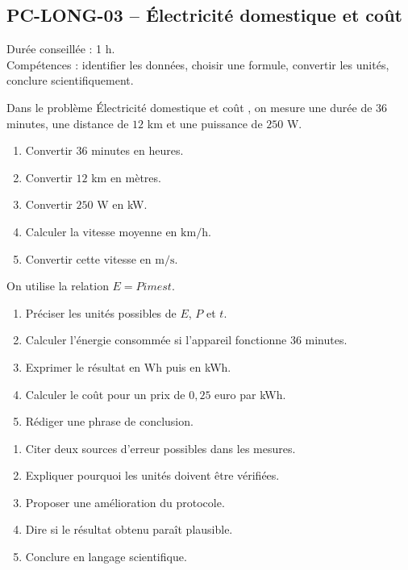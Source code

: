\documentclass[11pt,a4paper]{article}
\newcounter{exercice}
\begin{document}
\subsection{PC-LONG-03 -- Électricité domestique et coût}

\begin{objectif}
Durée conseillée : 1 h.\\
Compétences : identifier les données, choisir une formule, convertir les unités, conclure scientifiquement.
\end{objectif}
\begin{exercice}
Dans le problème \og Électricité domestique et coût \fg, on mesure une durée de $36$ minutes, une distance de $12$ km et une puissance de $250$ W.
\begin{enumerate}
  \item Convertir $36$ minutes en heures.
  \item Convertir $12$ km en mètres.
  \item Convertir $250$ W en kW.
  \item Calculer la vitesse moyenne en $\mathrm{km/h}$.
  \item Convertir cette vitesse en $\mathrm{m/s}$.
\end{enumerate}
\end{exercice}

\begin{exercice}
On utilise la relation $E=P	imes t$.
\begin{enumerate}
  \item Préciser les unités possibles de $E$, $P$ et $t$.
  \item Calculer l'énergie consommée si l'appareil fonctionne $36$ minutes.
  \item Exprimer le résultat en Wh puis en kWh.
  \item Calculer le coût pour un prix de $0{,}25$ euro par kWh.
  \item Rédiger une phrase de conclusion.
\end{enumerate}
\end{exercice}

\begin{exercice}
\begin{enumerate}
  \item Citer deux sources d'erreur possibles dans les mesures.
  \item Expliquer pourquoi les unités doivent être vérifiées.
  \item Proposer une amélioration du protocole.
  \item Dire si le résultat obtenu paraît plausible.
  \item Conclure en langage scientifique.
\end{enumerate}
\end{exercice}
\newpage
\end{document}
